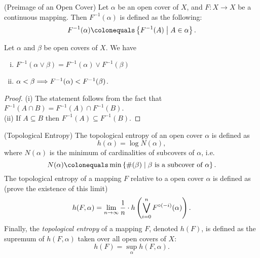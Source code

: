 \documentclass[12pt,twoside,draft]{book}
\begin{document}
\begin{definition}
  (Preimage of an Open Cover)
  Let $\alpha$ be an open cover of $X$, and $F: X \to X$ be a continuous mapping.
  Then $F^{-1}(\alpha)$ is defined as the following:
  \begin{equation*}
    F^{-1}(\alpha) \ceq \setst{F^{-1}(A)}{A \in \alpha}.
  \end{equation*}
\end{definition}
\begin{proposition}
  Let $\alpha$ and $\beta$ be open covers of $X$.
  We have
  \begin{enumerate}[(i)]
    \item $F^{-1}(\alpha \vee  \beta) = F^{-1}(\alpha) \vee F^{-1}(\beta)$
    \item $\alpha < \beta \Longrightarrow F^{-1}(\alpha) < F^{-1}(\beta)$.
  \end{enumerate}
  \begin{proof}
    (i) The statement follows from the fact that $F^{-1}(A \cap B) = F^{-1}(A) \cap F^{-1}(B)$. \\
    (ii) If $A \subseteq B$ then $F^{-1}(A) \subseteq F^{-1}(B)$.
  \end{proof}
\end{proposition}

\begin{definition}
  (Topological Entropy)
  The topological entropy of an open cover $\alpha$ is defined as
  \begin{equation*}
    h(\alpha) = \log N(\alpha),
  \end{equation*}
  where $N(\alpha)$ is the minimum of cardinalities of subcovers of $\alpha$, i.e.
  \begin{equation*}
    N(\alpha) \ceq \min\setst{ \#(\beta) }{ \beta \mbox{ is a subcover of } \alpha}.
  \end{equation*}
  The topological entropy of a mapping $F$ relative to a open cover $\alpha$ is defined as (prove the existence of this limit)
  \begin{equation*}
    h(F,\alpha) = \lim\limits_{n \to \infty} \frac{1}{n} \cdot h\left (  \bigvee\limits_{i=0}^n F^{\circ (-i)}(\alpha)  \right ).
  \end{equation*}
  Finally, the \textit{topological entropy} of a mapping $F$, denoted $h(F)$, is defined as the supremum of $h(F, \alpha)$ taken over all open covers of $X$:
  \begin{equation*}
    h(F) = \sup\limits_\alpha h(F,\alpha).
  \end{equation*}
  \label{defn:t-entropy}
\end{definition}
\end{document}
